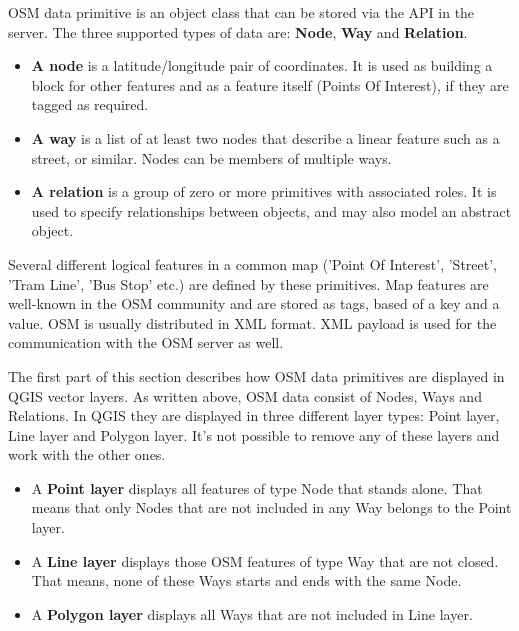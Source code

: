 OSM data primitive is an object class that can be stored via the API in the
server. The three supported types of data are: \textbf{Node}, \textbf{Way}
and \textbf{Relation}.

\begin{itemize}[label=--]
\item \textbf{A node} is a latitude/longitude pair of coordinates. It is
used as building a block for other features and as a feature itself (Points
Of Interest), if they are tagged as required.
\item \textbf{A way} is a list of at least two nodes that describe a linear
feature such as a street, or similar. Nodes can be members of multiple ways.
\item \textbf{A relation} is a group of zero or more primitives with
associated roles. It is used to specify relationships between objects,
and may also model an abstract object.
\end{itemize}

Several different logical features in a common map ('Point Of Interest',
'Street', 'Tram Line', 'Bus Stop' etc.) are defined by these primitives.
Map features are well-known in the OSM community and are stored as tags,
based of a key and a value. OSM is usually distributed in XML format. XML
payload is used for the communication with the OSM server as well.

\label{qgis-osm-connection}

The first part of this section describes how OSM data primitives
are displayed in QGIS vector layers. As written above, OSM data consist of
Nodes, Ways and Relations. In QGIS they are displayed in three different
layer types: Point layer, Line layer and Polygon layer. It's not possible
to remove any of these layers and work with the other ones.

\begin{itemize}[label=--]
\item A \textbf{Point layer} displays all features of type Node that stands
alone. That means that only Nodes that are not included in any Way belongs
to the Point layer.
\item A \textbf{Line layer} displays those OSM features of type Way that are
not closed. That means, none of these Ways starts and ends with the
same Node.
\item A \textbf{Polygon layer} displays all Ways that are not included in
Line layer.
\end{itemize}

